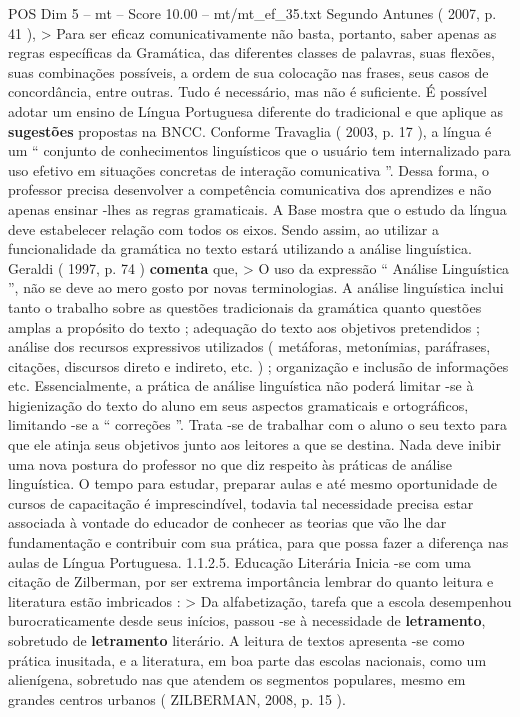 \begin{textsample}{POS Dim 5 – mt – Score 10.00 – mt/mt\_ef\_35.txt}
Segundo Antunes ( 2007, p. 41 ), > Para ser eficaz comunicativamente não basta, portanto, saber apenas as regras específicas da Gramática, das diferentes classes de palavras, suas flexões, suas combinações possíveis, a ordem de sua colocação nas frases, seus casos de concordância, entre outras.
Tudo é necessário, mas não é suficiente.
É possível adotar um ensino de Língua Portuguesa diferente do tradicional e que aplique as \textbf{sugestões} propostas na BNCC.
Conforme Travaglia ( 2003, p. 17 ), a língua é um “ conjunto de conhecimentos linguísticos que o usuário tem internalizado para uso efetivo em situações concretas de interação comunicativa ”.
Dessa forma, o professor precisa desenvolver a competência comunicativa dos aprendizes e não apenas ensinar -lhes as regras gramaticais.
A Base mostra que o estudo da língua deve estabelecer relação com todos os eixos.
Sendo assim, ao utilizar a funcionalidade da gramática no texto estará utilizando a análise linguística.
Geraldi ( 1997, p. 74 ) \textbf{comenta} que, > O uso da expressão “ Análise Linguística ”, não se deve ao mero gosto por novas terminologias.
A análise linguística inclui tanto o trabalho sobre as questões tradicionais da gramática quanto questões amplas a propósito do texto ; adequação do texto aos objetivos pretendidos ; análise dos recursos expressivos utilizados ( metáforas, metonímias, paráfrases, citações, discursos direto e indireto, etc. ) ; organização e inclusão de informações etc.
Essencialmente, a prática de análise linguística não poderá limitar -se à higienização do texto do aluno em seus aspectos gramaticais e ortográficos, limitando -se a “ correções ”.
Trata -se de trabalhar com o aluno o seu texto para que ele atinja seus objetivos junto aos leitores a que se destina.
Nada deve inibir uma nova postura do professor no que diz respeito às práticas de análise linguística.
O tempo para estudar, preparar aulas e até mesmo oportunidade de cursos de capacitação é imprescindível, todavia tal necessidade precisa estar associada à vontade do educador de conhecer as teorias que vão lhe dar fundamentação e contribuir com sua prática, para que possa fazer a diferença nas aulas de Língua Portuguesa. 1.1.2.5.
Educação Literária Inicia -se com uma citação de Zilberman, por ser extrema importância lembrar do quanto leitura e literatura estão imbricados : > Da alfabetização, tarefa que a escola desempenhou burocraticamente desde seus inícios, passou -se à necessidade de \textbf{letramento}, sobretudo de \textbf{letramento} literário.
A leitura de textos apresenta -se como prática inusitada, e a literatura, em boa parte das escolas nacionais, como um alienígena, sobretudo nas que atendem os segmentos populares, mesmo em grandes centros urbanos ( ZILBERMAN, 2008, p. 15 ).

\end{textsample}
